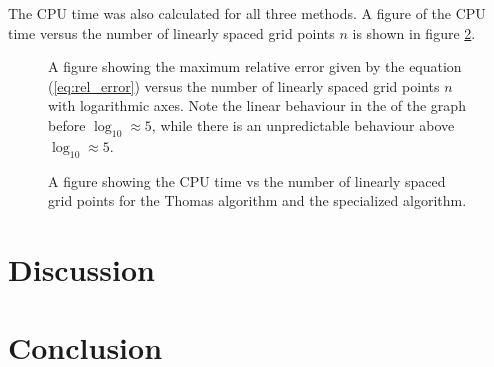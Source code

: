 \documentclass[twocolumn]{aastex62}
\begin{document}
The CPU time was also calculated for all three methods. A figure of the CPU time versus the number of linearly spaced grid points $n$ is shown in figure \ref{fig:CPUtimeplot}. 

\begin{figure}[ht]
	\caption{A figure showing the maximum relative error given by the equation (\ref{eq:rel_error}) versus the number of linearly spaced grid points $n$ with logarithmic axes. Note the linear behaviour in the of the graph before $\log_{10} \approx 5$, while there is an unpredictable behaviour above $\log_{10} \approx 5$.} 
	\label{fig:specerror}
\end{figure}

\begin{figure}[ht]
	\caption{A figure showing the CPU time vs the number of linearly spaced grid points for the Thomas algorithm and the specialized algorithm. }	\label{fig:CPUtimeplot}
\end{figure}






\section{Discussion} \label{sec:discussion}

\section{Conclusion} \label{sec:conclusion}



\end{document}
